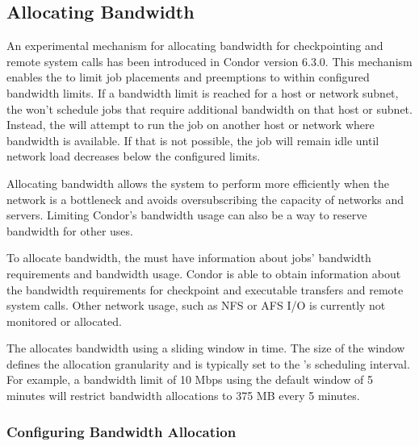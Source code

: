 \subsection{\label{sec:Bandwidth-Alloc}
Allocating Bandwidth}

An experimental mechanism for allocating bandwidth for checkpointing
and remote system calls has been introduced in Condor version 6.3.0.
This mechanism enables the  to limit job placements
and preemptions to within configured bandwidth limits.
If a bandwidth limit is reached for a host or network subnet, the
 won't schedule jobs that require additional
bandwidth on that host or subnet.
Instead, the  will attempt to run the job on
another host or network where bandwidth is available.
If that is not possible, the job will remain idle until network load
decreases below the configured limits.

Allocating bandwidth allows the system to perform more efficiently
when the network is a bottleneck and avoids oversubscribing the
capacity of networks and servers.
Limiting Condor's bandwidth usage can also be a way to reserve
bandwidth for other uses.

To allocate bandwidth, the  must have information
about jobs' bandwidth requirements and bandwidth usage.
Condor is able to obtain information about the bandwidth requirements
for checkpoint and executable transfers and remote system calls.
Other network usage, such as NFS or AFS I/O is currently not monitored
or allocated.

The  allocates bandwidth using a sliding window in
time.
The size of the window defines the allocation granularity and is
typically set to the 's scheduling interval.
For example, a bandwidth limit of 10 Mbps using the default window of
5 minutes will restrict bandwidth allocations to 375 MB every 5
minutes.

\subsubsection{\label{sec:Bandwidth-Alloc-Configure}
Configuring Bandwidth Allocation}

